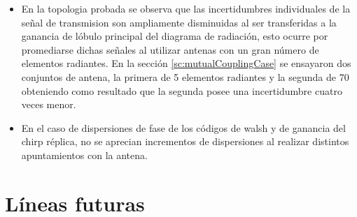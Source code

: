 \begin{itemize}
	\item En la topologia probada se observa que las incertidumbres individuales de la señal de transmision son ampliamente
		disminuidas al ser transferidas a la ganancia de lóbulo principal del diagrama de radiación, esto ocurre por
		promediarse dichas señales al utilizar antenas con un gran número de elementos radiantes. En la sección
		\ref{sc:mutualCouplingCase} se ensayaron dos conjuntos de antena, la primera de 5 elementos radiantes y la segunda de 70
		obteniendo como resultado que la segunda posee una incertidumbre cuatro veces menor.
	\item En el caso de dispersiones de fase de los códigos de walsh y de ganancia del chirp réplica, no se aprecian incrementos
		de dispersiones al realizar distintos apuntamientos con la antena.
\end{itemize}

\section{Líneas futuras}

